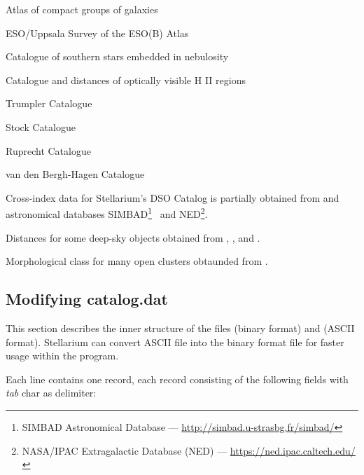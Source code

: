 \begin{description}[align=right,labelwidth=2cm]
\item[\textbf{HCG}]  Atlas of compact groups of galaxies~\citep{1993ApL....29....1H}
\item[\textbf{ESO}]  ESO/Uppsala Survey of the ESO(B) Atlas~\citep{1982ESO...C......0L}
\item[\textbf{vdBH}]  Catalogue of southern stars embedded in nebulosity~\citep{1975AJ.....80..208V}
\item[\textbf{DWB}]  Catalogue and distances of optically visible H II regions~\citep{1969A&A.....1..270D}
\item[\textbf{Tr}]  Trumpler Catalogue
\item[\textbf{St}]  Stock Catalogue
\item[\textbf{Ru}]  Ruprecht Catalogue
\item[\textbf{vdB-Ha}]  van den Bergh-Hagen Catalogue~\citep{1975AJ.....80...11V}
\end{description}

\noindent Cross-index data for Stellarium's DSO Catalog is partially obtained from 
 and astronomical databases 
SIMBAD\footnote{SIMBAD Astronomical Database --- \url{http://simbad.u-strasbg.fr/simbad/}}~\citep{2000A&AS..143....9W} 
and NED\footnote{NASA/IPAC Extragalactic Database (NED) --- \url{https://ned.ipac.caltech.edu/}}.

\noindent Distances for some deep-sky objects obtained from , ,  and .

\noindent Morphological class for many open clusters obtaunded from .

\subsection{Modifying catalog.dat}
\label{sec:dso:modifyingCatalog.dat}

This section describes the inner structure of the files 
(binary format) and  (ASCII format).
Stellarium can convert ASCII file into the binary format file for faster usage
within the program.

Each line contains one record, each record consisting of the following
fields with \emph{tab} char as delimiter:

